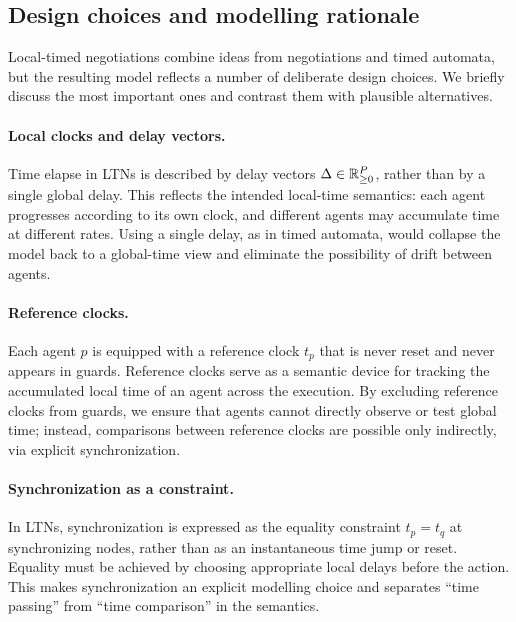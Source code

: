 
\subsection{Design choices and modelling rationale}
\label{subsec:ltn-design}

Local-timed negotiations combine ideas from negotiations and timed automata, but
the resulting model reflects a number of deliberate design choices.  We briefly
discuss the most important ones and contrast them with plausible alternatives.

\paragraph{Local clocks and delay vectors.}
Time elapse in LTNs is described by delay vectors $\Delta \in \mathbb{R}_{\ge 0}^{P}$, rather
than by a single global delay.  This reflects the intended local-time semantics:
each agent progresses according to its own clock, and different agents may
accumulate time at different rates.  Using a single delay, as in timed automata,
would collapse the model back to a global-time view and eliminate the possibility
of drift between agents.

\paragraph{Reference clocks.}
Each agent $p$ is equipped with a reference clock $t_p$ that is never reset and
never appears in guards.  Reference clocks serve as a semantic device for tracking
the accumulated local time of an agent across the execution.  By excluding
reference clocks from guards, we ensure that agents cannot directly observe or
test global time; instead, comparisons between reference clocks are possible only
indirectly, via explicit synchronization.

\paragraph{Synchronization as a constraint.}
In LTNs, synchronization is expressed as the equality constraint
$t_p = t_q$ at synchronizing nodes, rather than as an instantaneous time jump or
reset.  Equality must be achieved by choosing appropriate local delays before the
action.  This makes synchronization an explicit modelling choice and separates
``time passing'' from ``time comparison'' in the semantics.


